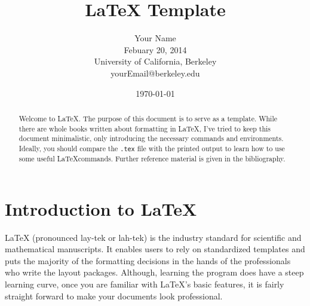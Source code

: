 \documentclass[11pt,letterpaper]{article} %
\begin{document}
\pagestyle{myheadings} %
\thispagestyle{plain} %

\title{\LaTeX{} Template}
\author{Your Name\\
	Febuary 20, 2014\\
	University of California, Berkeley\\
	yourEmail@berkeley.edu}
\date{\today}

\maketitle %



\begin{abstract}

Welcome to \LaTeX. The purpose of this document is to serve as a template. While there are whole books written about formatting in \LaTeX, I've tried to keep this document minimalistic, only introducing the necessary commands and environments. Ideally, you should compare the \texttt{.tex} file with the printed output to learn how to use some useful \LaTeX commands. Further reference material is given in the bibliography.

\end{abstract} %


\section{Introduction to \LaTeX}

\LaTeX{} (pronounced lay-tek or lah-tek) is the industry standard for scientific and mathematical manuscripts. It enables users to rely on standardized templates and puts the majority of the formatting decisions in the hands of the professionals who write the layout packages. Although, learning the program does have a steep learning curve, once you are familiar with \LaTeX's basic features, it is fairly straight forward to make your documents look professional.
\end{document}
